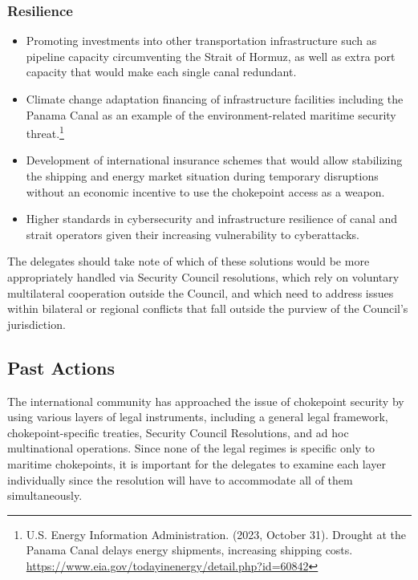 \subsubsection{Resilience}

\begin{itemize}
  \item Promoting investments into other transportation infrastructure such as pipeline capacity circumventing the Strait of Hormuz, as well as extra port capacity that would make each single canal redundant.
  \item Climate change adaptation financing of infrastructure facilities including the Panama Canal as an example of the environment-related maritime security threat.\footnote{U.S. Energy Information Administration. (2023, October 31). Drought at the Panama Canal delays energy shipments, increasing shipping costs. \url{https://www.eia.gov/todayinenergy/detail.php?id=60842}}
  \item Development of international insurance schemes that would allow stabilizing the shipping and energy market situation during temporary disruptions without an economic incentive to use the chokepoint access as a weapon.
  \item Higher standards in cybersecurity and infrastructure resilience of canal and strait operators given their increasing vulnerability to cyberattacks.
\end{itemize}

The delegates should take note of which of these solutions would be more appropriately handled via Security Council resolutions, which rely on voluntary multilateral cooperation outside the Council, and which need to address issues within bilateral or regional conflicts that fall outside the purview of the Council's jurisdiction.

\subsection{Past Actions}

The international community has approached the issue of chokepoint security by using various layers of legal instruments, including a general legal framework, chokepoint-specific treaties, Security Council Resolutions, and ad hoc multinational operations. Since none of the legal regimes is specific only to maritime chokepoints, it is important for the delegates to examine each layer individually since the resolution will have to accommodate all of them simultaneously.

